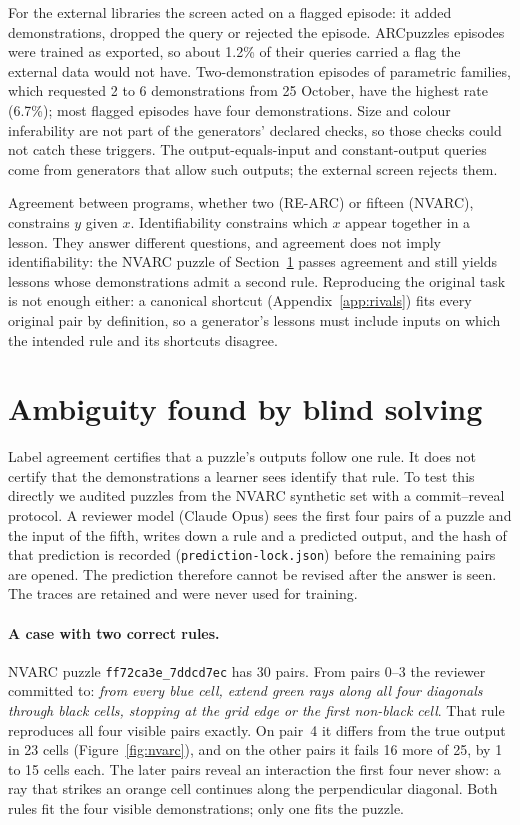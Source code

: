 \documentclass[11pt]{article}
\begin{document}
\noindent For the external libraries the screen acted on a flagged episode: it
added demonstrations, dropped the query or rejected the episode. ARCpuzzles
episodes were trained as exported, so about 1.2\% of their queries carried a
flag the external data would not have. Two-demonstration episodes of parametric
families, which requested 2 to 6 demonstrations from 25 October, have the
highest rate (6.7\%); most flagged episodes have four demonstrations. Size and
colour inferability are not part of the generators' declared checks, so those
checks could not catch these triggers. The output-equals-input
and constant-output queries come from generators that allow such outputs; the
external screen rejects them.

Agreement between programs, whether two (RE-ARC) or fifteen (NVARC), constrains
$y$ given $x$. Identifiability constrains which $x$ appear together in a lesson.
They answer different questions, and agreement does not imply
identifiability: the NVARC puzzle of Section~\ref{sec:blind} passes agreement
and still yields lessons whose demonstrations admit a second rule. Reproducing
the original task is not enough either: a canonical shortcut
(Appendix~\ref{app:rivals}) fits every original pair by definition, so a
generator's lessons must include inputs on which the intended rule and its
shortcuts disagree.

\section{Ambiguity found by blind solving}
\label{sec:blind}

Label agreement certifies that a puzzle's outputs follow one rule. It does not
certify that the demonstrations a learner sees identify that rule. To test
this directly we audited puzzles from the NVARC synthetic set
\cite{nvarc} with a commit--reveal protocol. A reviewer model (Claude Opus)
sees the first four pairs of a puzzle and the input of the fifth, writes down
a rule and a predicted output, and the hash of that prediction is recorded
(\texttt{prediction-lock.json}) before the remaining pairs are opened. The
prediction therefore cannot be revised after the answer is seen. The traces are
retained and were never used for training.

\paragraph{A case with two correct rules.} NVARC puzzle
\texttt{ff72ca3e\_7ddcd7ec} has 30 pairs. From pairs 0--3 the reviewer committed
to: \emph{from every blue cell, extend green rays along all four diagonals
through black cells, stopping at the grid edge or the first non-black cell}.
That rule reproduces all four visible pairs exactly. On pair~4 it differs from
the true output in 23 cells (Figure~\ref{fig:nvarc}), and on the other pairs it
fails 16 more of 25, by 1 to 15 cells each. The later pairs reveal an
interaction the first four never show: a ray that strikes an orange cell
continues along the perpendicular diagonal. Both rules fit the four visible
demonstrations; only one fits the puzzle.
\end{document}
